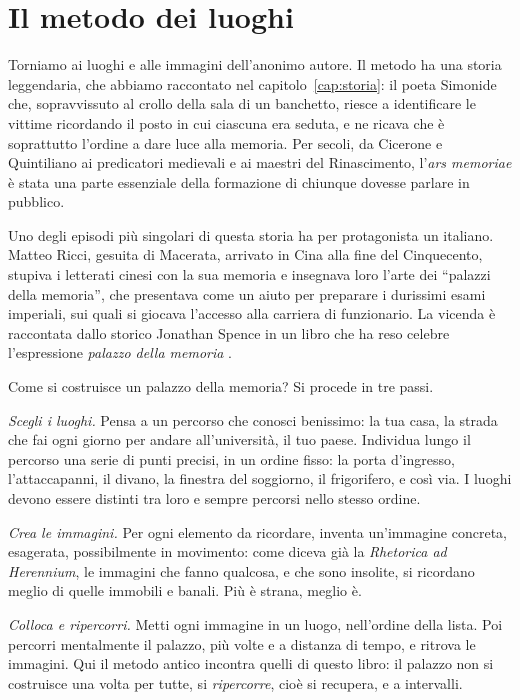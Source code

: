 \section{Il metodo dei luoghi}

Torniamo ai luoghi e alle immagini dell'anonimo autore. Il metodo ha
una storia leggendaria, che abbiamo raccontato nel
capitolo~\ref{cap:storia}: il poeta Simonide che, sopravvissuto al
crollo della sala di un banchetto, riesce a identificare le vittime
ricordando il posto in cui ciascuna era seduta, e ne ricava che è
soprattutto l'ordine a dare luce alla memoria. Per secoli, da Cicerone
e Quintiliano ai predicatori medievali e ai maestri del Rinascimento,
l'\emph{ars memoriae} è stata una parte essenziale della formazione di
chiunque dovesse parlare in pubblico.

Uno degli episodi più singolari di questa storia ha per protagonista
un italiano. Matteo Ricci, gesuita di Macerata, arrivato in Cina alla
fine del Cinquecento, stupiva i letterati cinesi con la sua memoria e
insegnava loro l'arte dei \enquote{palazzi della memoria}, che
presentava come un aiuto per preparare i durissimi esami imperiali, sui
quali si giocava l'accesso alla carriera di funzionario. La vicenda è
raccontata dallo storico Jonathan Spence in un libro che ha reso celebre
l'espressione \emph{palazzo della memoria} \parencite{spence1984}.

Come si costruisce un palazzo della memoria? Si procede in tre passi.

\emph{Scegli i luoghi.} Pensa a un percorso che conosci benissimo: la
tua casa, la strada che fai ogni giorno per andare all'università, il
tuo paese. Individua lungo il percorso una serie di punti precisi, in
un ordine fisso: la porta d'ingresso, l'attaccapanni, il divano, la
finestra del soggiorno, il frigorifero, e così via. I luoghi devono
essere distinti tra loro e sempre percorsi nello stesso ordine.

\emph{Crea le immagini.} Per ogni elemento da ricordare, inventa
un'immagine concreta, esagerata, possibilmente in movimento: come diceva
già la \emph{Rhetorica ad Herennium}, le immagini che fanno qualcosa, e
che sono insolite, si ricordano meglio di quelle immobili e banali. Più
è strana, meglio è.

\emph{Colloca e ripercorri.} Metti ogni immagine in un luogo, nell'ordine
della lista. Poi percorri mentalmente il palazzo, più volte e a
distanza di tempo, e ritrova le immagini. Qui il metodo antico incontra
quelli di questo libro: il palazzo non si costruisce una volta per
tutte, si \emph{ripercorre}, cioè si recupera, e a intervalli.

